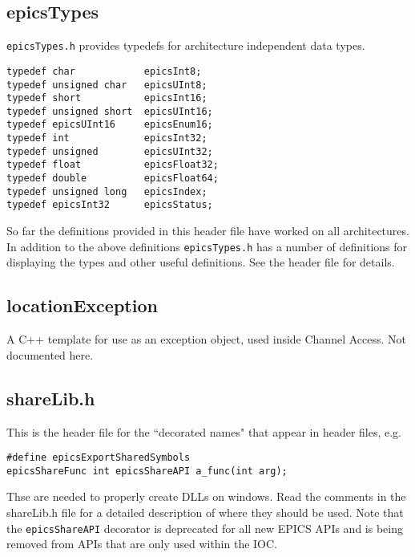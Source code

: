 \subsection{epicsTypes}

\verb|epicsTypes.h| provides typedefs for architecture independent data types.

\begin{verbatim}
typedef char            epicsInt8;
typedef unsigned char   epicsUInt8;
typedef short           epicsInt16;
typedef unsigned short  epicsUInt16;
typedef epicsUInt16     epicsEnum16;
typedef int             epicsInt32;
typedef unsigned        epicsUInt32;
typedef float           epicsFloat32;
typedef double          epicsFloat64;
typedef unsigned long   epicsIndex;
typedef epicsInt32      epicsStatus;
\end{verbatim}

So far the definitions provided in this header file have worked on all architectures. In addition to the above definitions 
\verb|epicsTypes.h| has a number of definitions for displaying the types and other useful definitions. See the header file for 
details.

\subsection{locationException}

A C++ template for use as an exception object, used inside Channel Access. Not documented here.

\subsection{shareLib.h}

This is the header file for the ``decorated names" that appear in header files, e.g.

\begin{verbatim}
#define epicsExportSharedSymbols
epicsShareFunc int epicsShareAPI a_func(int arg);
\end{verbatim}

Thse are needed to properly create DLLs on windows. Read the comments in the shareLib.h file for a detailed description 
of where they should be used. Note that the \verb|epicsShareAPI| decorator is deprecated for all new EPICS APIs and is 
being removed from APIs that are only used within the IOC.

